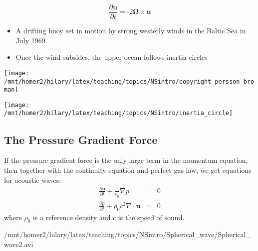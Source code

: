 \begin{minipage}[c]{0.35\columnwidth}%
\[
\frac{\partial\mathbf{u}}{\partial t}=\text{-}2\bm{\Omega}\times\mathbf{u}
\]

\begin{itemize}
\item \begin{flushleft}
A drifting buoy set in motion by strong westerly winds in the Baltic
Sea in July 1969. 
\par\end{flushleft}
\item \begin{flushleft}
Once the wind subsides, the upper ocean follows inertia circles
\par\end{flushleft}
\end{itemize}
\texttt{[image: /mnt/homer2/hilary/latex/teaching/topics/NSintro/copyright\_persson\_broman]}%
\end{minipage}\hfill{}%
\begin{minipage}[c]{0.6\columnwidth}%
\texttt{[image: /mnt/homer2/hilary/latex/teaching/topics/NSintro/inertia\_circle]}%
\end{minipage}


\subsection{The Pressure Gradient Force}

\begin{minipage}[c]{0.48\columnwidth}%
If the pressure gradient force is the only large term in the momentum
equation, then together with the continuity equation and perfect gas
law, we get equations for acoustic waves:
\begin{eqnarray*}
\frac{\partial\mathbf{u}}{\partial t}+\frac{1}{\rho_{0}}\nabla p & = & 0\\
\frac{\partial p}{\partial t}+\rho_{0}c^{2}\nabla\cdot\mathbf{u} & = & 0
\end{eqnarray*}
where $\rho_{0}$ is a reference density and $c$ is the speed of
sound.%
\end{minipage}\hfill{}%
\begin{minipage}[c]{0.48\columnwidth}%
{/mnt/homer2/hilary/latex/teaching/topics/NSintro/Spherical_wave/Spherical_wave2.avi}%
\end{minipage}

